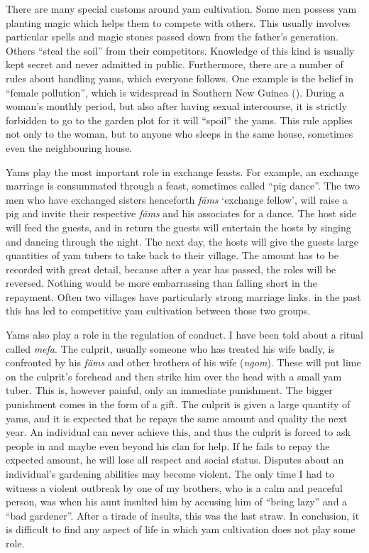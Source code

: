 There are many special customs around yam cultivation. Some men possess yam planting magic which helps them to compete with others. This usually involves particular spells and magic stones passed down from the father's generation. Others ``steal the soil'' from their competitors. Knowledge of this kind is usually kept secret and never admitted in public. Furthermore, there are a number of rules about handling yams, which everyone follows. One example is the belief in ``female pollution'', which is widespread in Southern New Guinea (\citealt[104]{Knauft:1993south}). During a woman's monthly period, but also after having sexual intercourse, it is strictly forbidden to go to the garden plot for it will ``spoil'' the yams. This rule applies not only to the woman, but to anyone who sleeps in the same house, sometimes even the neighbouring house.%

Yams play the most important role in exchange feasts. For example, an exchange marriage is consummated through a feast, sometimes called ``pig dance''. The two men who have exchanged sisters henceforth \emph{fäms} `exchange fellow', will raise a pig and invite their respective \emph{fäms} and his associates for a dance. The host side will feed the guests, and in return the guests will entertain the hosts by singing and dancing through the night. The next day, the hosts will give the guests large quantities of yam tubers to take back to their village. The amount has to be recorded with great detail, because after a year has passed, the roles will be reversed. Nothing would be more embarrassing than falling short in the repayment. Often two villages have particularly strong marriage links. in the past this has led to competitive yam cultivation between those two groups.%

Yams also play a role in the regulation of conduct. I have been told about a ritual called \emph{mefa}. The culprit, usually someone who has treated his wife badly, is confronted by his \emph{fäms} and other brothers of his wife (\emph{ngom}). These will put lime on the culprit's forehead and then strike him over the head with a small yam tuber. This is, however painful, only an immediate punishment. The bigger punishment comes in the form of a gift. The culprit is given a large quantity of yams, and it is expected that he repays the same amount and quality the next year. An individual can never achieve this, and thus the culprit is forced to ask people in and maybe even beyond his clan for help. If he fails to repay the expected amount, he will lose all respect and social status. Disputes about an individual's gardening abilities may become violent. The only time I had to witness a violent outbreak by one of my brothers, who is a calm and peaceful person, was when his aunt insulted him by accusing him of ``being lazy'' and a ``bad gardener''. After a tirade of insults, this was the last straw. In conclusion, it is difficult to find any aspect of life in which yam cultivation does not play some role.

